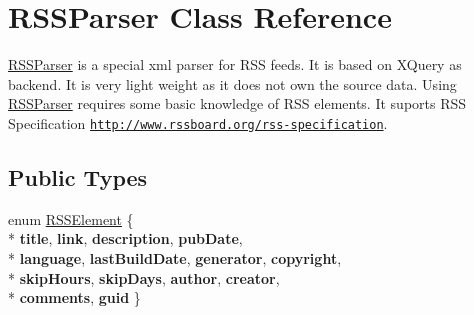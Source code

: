 \hypertarget{class_r_s_s_parser}{\section{R\-S\-S\-Parser Class Reference}
\label{class_r_s_s_parser}
}


\hyperlink{class_r_s_s_parser}{R\-S\-S\-Parser} is a special xml parser for R\-S\-S feeds. It is based on X\-Query as backend. It is very light weight as it does not own the source data. Using \hyperlink{class_r_s_s_parser}{R\-S\-S\-Parser} requires some basic knowledge of R\-S\-S elements. It suports R\-S\-S Specification \href{http://www.rssboard.org/rss-specification}{\tt http\-://www.\-rssboard.\-org/rss-\/specification}.  


\subsection*{Public Types}
\begin{DoxyCompactItemize}
\item 
enum \hyperlink{class_r_s_s_parser_a7abe04d86afbba935a94443444685310}{R\-S\-S\-Element} \{ \\*
{\bfseries title}, 
{\bfseries link}, 
{\bfseries description}, 
{\bfseries pub\-Date}, 
\\*
{\bfseries language}, 
{\bfseries last\-Build\-Date}, 
{\bfseries generator}, 
{\bfseries copyright}, 
\\*
{\bfseries skip\-Hours}, 
{\bfseries skip\-Days}, 
{\bfseries author}, 
{\bfseries creator}, 
\\*
{\bfseries comments}, 
{\bfseries guid}
 \}
\end{DoxyCompactItemize}
